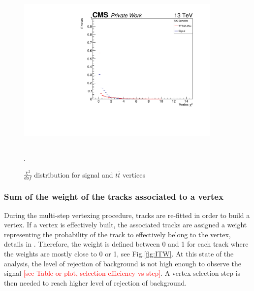 \documentclass{cernatlasnote}
\begin{document}
\begin{figure}[ht]
\centering
\includegraphics[height=8cm, width=10cm, trim= 0cm 0cm 0cm 0cm,clip]{images/VTXBDT/plot_VtxChi.pdf}
\caption{\label{fig:VTXChi2} $\frac{\chi^2}{dof}$ distribution for signal and $t\bar{t}$ vertices}. 
\end{figure} 
\pagebreak


\subsubsection{Sum of the weight of the tracks associated to a vertex}
\label{APP: MWT}
During the multi-step vertexing procedure, tracks are re-fitted in order to build a vertex. If a vertex is effectively built, the associated tracks are assigned a weight representing the probability of the track to effectively belong to the vertex, details in \cite{AVF}. Therefore, the weight is defined between 0 and 1 for each track where the weights are mostly close to 0 or 1, see Fig.\ref{fig:ITW}. 
At this state of the analysis, the level of rejection of background is not high enough to observe the signal \textcolor{red}{[see Table or plot, selection efficiency vs step]}. A vertex selection step is then needed to reach higher level of rejection of background. \\
\end{document}
